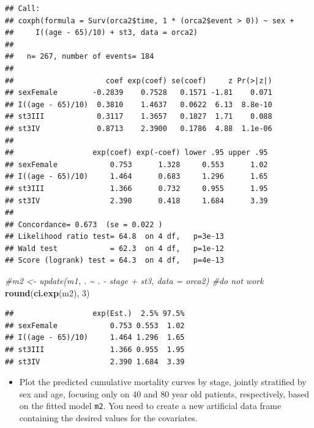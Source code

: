 \documentclass[
]{book}
\newenvironment{Shaded}{\begin{snugshade}}{\end{snugshade}}
\newcommand{\CommentTok}[1]{\textcolor[rgb]{0.56,0.35,0.01}{\textit{#1}}}
\newcommand{\DecValTok}[1]{\textcolor[rgb]{0.00,0.00,0.81}{#1}}
\newcommand{\FunctionTok}[1]{\textcolor[rgb]{0.13,0.29,0.53}{\textbf{#1}}}
\newcommand{\NormalTok}[1]{#1}
\providecommand{\tightlist}{%
  \setlength{\itemsep}{0pt}\setlength{\parskip}{0pt}}
\theoremstyle{definition}
\theoremstyle{definition}
\theoremstyle{definition}
\theoremstyle{definition}
\theoremstyle{remark}
\begin{document}
\begin{verbatim}
## Call:
## coxph(formula = Surv(orca2$time, 1 * (orca2$event > 0)) ~ sex + 
##     I((age - 65)/10) + st3, data = orca2)
## 
##   n= 267, number of events= 184 
## 
##                     coef exp(coef) se(coef)     z Pr(>|z|)
## sexFemale        -0.2839    0.7528   0.1571 -1.81    0.071
## I((age - 65)/10)  0.3810    1.4637   0.0622  6.13  8.8e-10
## st3III            0.3117    1.3657   0.1827  1.71    0.088
## st3IV             0.8713    2.3900   0.1786  4.88  1.1e-06
## 
##                  exp(coef) exp(-coef) lower .95 upper .95
## sexFemale            0.753      1.328     0.553      1.02
## I((age - 65)/10)     1.464      0.683     1.296      1.65
## st3III               1.366      0.732     0.955      1.95
## st3IV                2.390      0.418     1.684      3.39
## 
## Concordance= 0.673  (se = 0.022 )
## Likelihood ratio test= 64.8  on 4 df,   p=3e-13
## Wald test            = 62.3  on 4 df,   p=1e-12
## Score (logrank) test = 64.3  on 4 df,   p=4e-13
\end{verbatim}

\begin{Shaded}
\begin{Highlighting}[]
\CommentTok{\#m2 \textless{}{-} update(m1, . \textasciitilde{} . {-} stage + st3, data = orca2) \#do not work}
\FunctionTok{round}\NormalTok{(}\FunctionTok{ci.exp}\NormalTok{(m2), }\DecValTok{3}\NormalTok{)}
\end{Highlighting}
\end{Shaded}

\begin{verbatim}
##                  exp(Est.)  2.5% 97.5%
## sexFemale            0.753 0.553  1.02
## I((age - 65)/10)     1.464 1.296  1.65
## st3III               1.366 0.955  1.95
## st3IV                2.390 1.684  3.39
\end{verbatim}

\begin{itemize}
\tightlist
\item
  Plot the predicted cumulative mortality curves by stage, jointly
  stratified by sex and age, focusing only on 40 and 80 year old
  patients, respectively, based on the fitted model \texttt{m2}. You need to
  create a new artificial data frame containing the desired values for
  the covariates.
\end{itemize}
\end{document}
